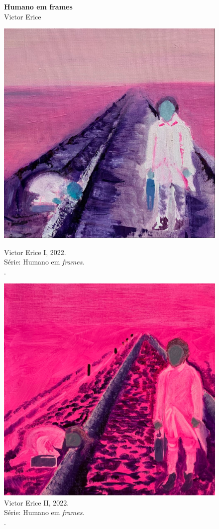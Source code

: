 \vfill

\begin{figure}[b]
  \caption[Humano em frames: Victor Erice]{\textbf{Humano em frames} \\ Victor Erice}
  \begin{minipage}[t]{.45\linewidth}
	\includegraphics[width = .7\linewidth]{apendice/pinturas-finalizadas/boudet-victor-erice-i.pdf}
  \caption*{Victor Erice I, 2022. \\ Série: Humano em \emph{frames}. \\ \oleo. \\ }
\end{minipage}
\begin{minipage}[t]{.45\linewidth}
	\includegraphics[width = \linewidth]{apendice/pinturas-finalizadas/boudet-victor-erice-iI.pdf}
  \caption*{Victor Erice II, 2022. \\ Série: Humano em \emph{frames}. \\ \oleolinho. \\ }
\end{minipage}
\end{figure}

